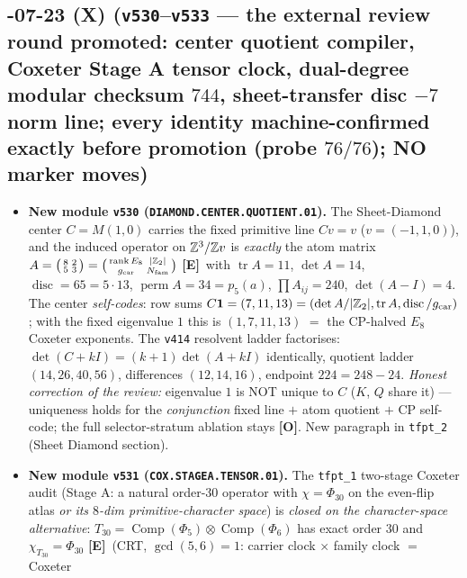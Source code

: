 \documentclass[11pt]{article}
\providecommand{\mE}{\textbf{[E]}}\providecommand{\mC}{\textbf{[C]}}
\providecommand{\mO}{\textbf{[O]}}\providecommand{\mX}{\textbf{[X]}}
\providecommand{\vref}[1]{\texttt{#1}}
\providecommand{\gcar}{g_{\mathrm{car}}}\providecommand{\Nfam}{N_{\mathrm{fam}}}
\begin{document}
\subsection*{-07-23 (X) (\texttt{v530}--\texttt{v533} --- the external review round promoted: center quotient compiler, Coxeter Stage A tensor clock, dual-degree modular checksum $744$, sheet-transfer disc $-7$ norm line; every identity machine-confirmed exactly before promotion (probe $76/76$); NO marker moves)}
\begin{itemize}[leftmargin=1.5em]
\item \textbf{New module \texttt{v530} (\texttt{DIAMOND.CENTER.QUOTIENT.01}).} The Sheet-Diamond center $C=M(1,0)$
carries the fixed primitive line $Cv=v$ ($v=(-1,1,0)$), and the induced operator on $\mathbb{Z}^3/\mathbb{Z} v$ is
\emph{exactly} the atom matrix $A=\big(\begin{smallmatrix}8&2\\5&3\end{smallmatrix}\big)
=\big(\begin{smallmatrix}\operatorname{rank}E_8&|\Z_2|\\ \gcar&\Nfam\end{smallmatrix}\big)$ \mE\ with
$\operatorname{tr}A=11$, $\det A=14$, $\operatorname{disc}=65=5\cdot13$, $\operatorname{perm}A=34=p_5(a)$,
$\prod A_{ij}=240$, $\det(A{-}I)=4$. The center \emph{self-codes}: row sums
$C\mathbf 1=(7,11,13)=(\det A/|\Z_2|,\operatorname{tr}A,\operatorname{disc}/\gcar)$; with the fixed
eigenvalue $1$ this is $(1,7,11,13)$ $=$ the CP-halved $E_8$ Coxeter exponents. The \vref{v414} resolvent
ladder factorises: $\det(C{+}kI)=(k{+}1)\det(A{+}kI)$ identically, quotient ladder $(14,26,40,56)$,
differences $(12,14,16)$, endpoint $224=248-24$. \emph{Honest correction of the review:} eigenvalue $1$ is
NOT unique to $C$ ($K$, $Q$ share it) --- uniqueness holds for the \emph{conjunction} fixed line $+$ atom
quotient $+$ CP self-code; the full selector-stratum ablation stays \mO. New paragraph in
\texttt{tfpt\_2} (Sheet Diamond section).
\item \textbf{New module \texttt{v531} (\texttt{COX.STAGEA.TENSOR.01}).} The \texttt{tfpt\_1} two-stage Coxeter
audit (Stage A: a natural order-$30$ operator with $\chi=\Phi_{30}$ on the even-flip atlas \emph{or its
$8$-dim primitive-character space}) is \emph{closed on the character-space alternative}: $T_{30}=
\operatorname{Comp}(\Phi_5)\otimes\operatorname{Comp}(\Phi_6)$ has exact order $30$ and
$\chi_{T_{30}}=\Phi_{30}$ \mE\ (CRT, $\gcd(5,6)=1$: carrier clock $\times$ family clock $=$ Coxeter

\end{itemize}
\end{document}
